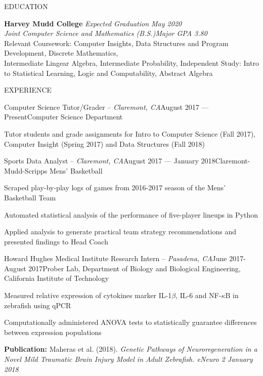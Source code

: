 \documentclass{resume} %
\begin{document}

\begin{rSection}{EDUCATION}

{\bf Harvey Mudd College} \hfill {\em Expected Graduation May 2020} \\
{\em Joint Computer Science and Mathematics (B.S.)}\hfill {\em Major GPA 3.80} \\
Relevant Coursework: Computer Insights, Data Structures and Program Development, Discrete Mathematics, \\Intermediate Lingear Algebra, Intermediate Probability, Independent Study: Intro to Statistical Learning, Logic and Computability, Abstract Algebra
\end{rSection}

\begin{rSection}{EXPERIENCE}
\begin{rSubsection}{Computer Science Tutor/Grader -- {\it Claremont, CA}}{August 2017 --- Present}{Computer Science Department}

\item Tutor students and grade assignments for Intro to Computer Science (Fall 2017), Computer Insight (Spring 2017) and Data Structures (Fall 2018)
\end{rSubsection}

\begin{rSubsection}{Sports Data Analyst -- {\it Claremont, CA}}{August 2017 --- January 2018}{Claremont-Mudd-Scripps Mens' Basketball}

\item Scraped play-by-play logs of games from 2016-2017 season of the Mens' Basketball Team
\item Automated statistical analysis of the performance of five-player lineups in Python
\item Applied analysis to generate practical team strategy recommendations and presented findings to Head Coach

\end{rSubsection}


\begin{rSubsection}{Howard Hughes Medical Institute Research Intern -- {\it Pasadena, CA}}{June 2017-August 2017}{Prober Lab, Department of Biology and Biological Engineering, California Institute of Technology}

\item Measured relative expression of cytokines marker IL-1$\beta$, IL-6 and NF-$\kappa$B in zebrafish using qPCR
\item Computationally administered ANOVA tests to statistically guarantee differences between expression populations
\item \textbf{Publication:} Maheras et al. (2018). \textit{Genetic Pathways of Neuroregeneration in a Novel Mild
Traumatic Brain Injury Model in Adult Zebrafish. eNeuro 2 January 2018}
\end{rSubsection}

\end{rSection}
\end{document}
